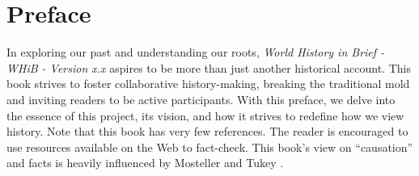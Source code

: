 \documentclass[a4paper,12pt]{book}
\begin{document}
\begin{titlepage}
\end{titlepage}



\tableofcontents
\cleardoublepage

\chapter*{Preface}
In exploring our past and understanding our roots, \emph{World History in Brief - WHiB - Version x.x} aspires to be more than just another historical account. This book strives to foster collaborative history-making, breaking the traditional mold and inviting readers to be active participants. With this preface, we delve into the essence of this project, its vision, and how it strives to redefine how we view history. Note that this book has very few references. The reader is encouraged to use resources available on the Web to fact-check. This book's view on ``causation'' and facts is heavily influenced by Mosteller and Tukey \cite{mosteller1977}.
\end{document}
